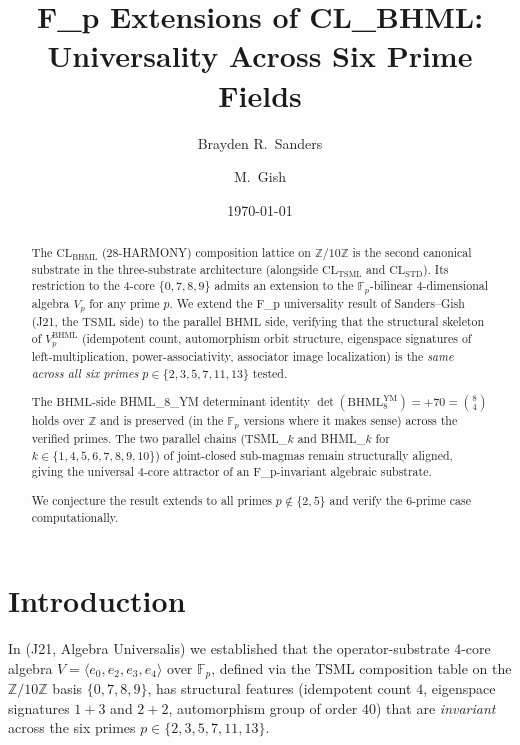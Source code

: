 \documentclass[11pt,reqno]{amsart}
\title[F_p Extensions of CL_BHML]
{F_p Extensions of CL\_BHML: Universality Across Six Prime Fields}
\author{Brayden R.~Sanders}
\author{M.~Gish}
\date{\today}
\theoremstyle{plain}
\theoremstyle{definition}
\theoremstyle{remark}
\newcommand{\Z}{\mathbb{Z}}
\newcommand{\F}{\mathbb{F}}
\newcommand{\TSML}{\mathrm{TSML}}
\newcommand{\BHML}{\mathrm{BHML}}
\begin{document}
\begin{abstract}
The $\mathrm{CL}_\BHML$ ($28$-HARMONY) composition lattice on
$\Z/10\Z$ is the second canonical substrate in the three-substrate
architecture (alongside $\mathrm{CL}_\TSML$ and $\mathrm{CL}_\mathrm{STD}$).
Its restriction to the $4$-core $\{0,7,8,9\}$ admits an extension to
the $\F_p$-bilinear $4$-dimensional algebra $V_p$ for any prime $p$.
We extend the F_p universality result of Sanders--Gish
\cite{SandersGishFpTSML} (J21, the $\TSML$ side) to the parallel
$\BHML$ side, verifying that the structural skeleton of $V_p^\BHML$
(idempotent count, automorphism orbit structure, eigenspace
signatures of left-multiplication, power-associativity, associator
image localization) is the \emph{same across all six primes}
$p \in \{2, 3, 5, 7, 11, 13\}$ tested.

The $\BHML$-side BHML\_8\_YM determinant identity
$\det(\BHML_8^{\text{YM}}) = +70 = \binom{8}{4}$ holds over $\Z$ and
is preserved (in the $\F_p$ versions where it makes sense) across the
verified primes. The two parallel chains (TSML\_$k$ and BHML\_$k$ for
$k \in \{1, 4, 5, 6, 7, 8, 9, 10\}$) of joint-closed sub-magmas
remain structurally aligned, giving the universal $4$-core attractor
of \cite{SandersGishFourCore} an F_p-invariant algebraic substrate.

We conjecture the result extends to all primes $p \notin \{2, 5\}$ and
verify the $6$-prime case computationally.
\end{abstract}

\maketitle

\tableofcontents

\section{Introduction}

In \cite{SandersGishFpTSML} (J21, Algebra Universalis) we established
that the operator-substrate $4$-core algebra
$V = \langle e_0, e_2, e_3, e_4 \rangle$ over $\F_p$, defined via the
$\TSML$ composition table on the $\Z/10\Z$ basis $\{0, 7, 8, 9\}$,
has structural features (idempotent count $4$, eigenspace signatures
$1{+}3$ and $2{+}2$, automorphism group of order $40$) that are
\emph{invariant} across the six primes $p \in \{2,3,5,7,11,13\}$.
\end{document}
